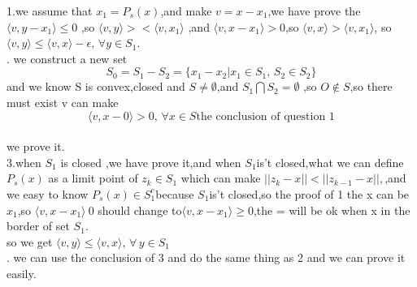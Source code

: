 \documentclass[11pt,letter,notitlepage]{article}
\begin{document}
\begin{solution}
	1.we assume that $x_1 = P_s(x)$,and make $ v = x - x_1$,we have prove the $	\langle v,y-x_1	\rangle \leq 0$ ,so $\langle v,y \rangle> < \langle v,x_1 \rangle $ ,and 
$\langle v,x-x_1\rangle > 0$,so $\langle v,x \rangle > \langle v,x_1 \rangle $, so$\langle v,y \rangle \leq \langle v,x \rangle -\epsilon ,\,\forall y \in S_1$. \\
. we  construct a new set $$ S_0 = S_1 -S_2 = \{x_1 - x_2|x_1 \in S_1 ,\, S_2 \in S_2 \}$$
	and we know S is convex,closed and $S \neq \emptyset$,and $S_1 \bigcap S_2 = \emptyset$ ,so $ O \notin S$,so there must exist v can make $$ \langle v,x-0 \rangle > 0,\,\forall x \in S \text{the conclusion of question 1} $$ \\ \indent we prove it.
	\indent \\
	\indent3.when $S_1$ is closed ,we have prove it,and when $S_1 $is't closed,what we can define $P_s(x)$ as a limit point of  $z_k \in S_1$ which can make $ ||z_k - x||  < ||z_{k-1} - x||,$,and we easy to know $P_s(x) \in S_1^c$because $S_1 $is't closed,so the proof of 1 the x can be $x_1$,so $ \langle v,x - x_1 \rangle \> 0$ should change to$ \langle v,x - x_1 \rangle \geq 0 $,the = will be ok when x in the border of set $S_1$. \\
 \indent	so we get $\langle v,y\rangle\leq\langle v, x\rangle,\,\forall\,y\in S_1$
\\
. we can use the conclusion of 3 and do the same thing as 2 and we can prove it easily.

\end{solution}



\end{document}
